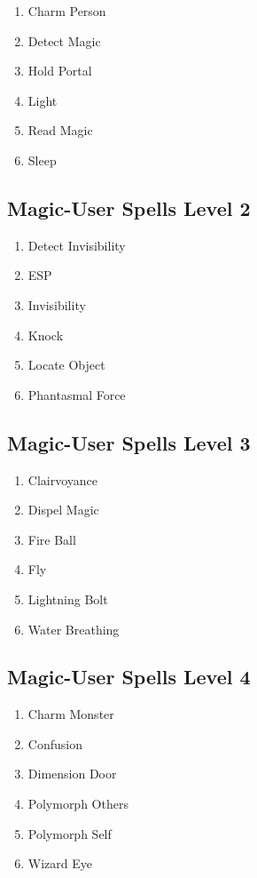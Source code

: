 \begin{enumerate}
\def\labelenumi{\arabic{enumi}.}
\tightlist
\item
  Charm Person
\item
  Detect Magic
\item
  Hold Portal
\item
  Light
\item
  Read Magic
\item
  Sleep
\end{enumerate}

\subsection{Magic-User Spells Level 2}\label{magic-user-spells-level-2}

\begin{enumerate}
\def\labelenumi{\arabic{enumi}.}
\tightlist
\item
  Detect Invisibility
\item
  ESP
\item
  Invisibility
\item
  Knock
\item
  Locate Object
\item
  Phantasmal Force
\end{enumerate}

\subsection{Magic-User Spells Level 3}\label{magic-user-spells-level-3}

\begin{enumerate}
\def\labelenumi{\arabic{enumi}.}
\tightlist
\item
  Clairvoyance
\item
  Dispel Magic
\item
  Fire Ball
\item
  Fly
\item
  Lightning Bolt
\item
  Water Breathing
\end{enumerate}

\subsection{Magic-User Spells Level 4}\label{magic-user-spells-level-4}

\begin{enumerate}
\def\labelenumi{\arabic{enumi}.}
\tightlist
\item
  Charm Monster
\item
  Confusion
\item
  Dimension Door
\item
  Polymorph Others
\item
  Polymorph Self
\item
  Wizard Eye
\end{enumerate}

